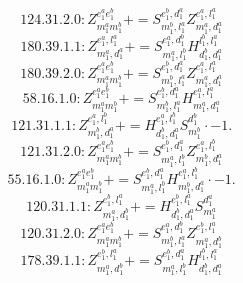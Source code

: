 \documentclass[letterpaper,10pt,fleqn,leqno,onecolumn]{article}
\begin{document}
\begin{equation} \;\;\;\;\;\;  124.31.2.0: Z^{e_{1}^{a}e_{1}^{b}}_{m_{1}^{a}m_{1}^{b}}+=S^{e_{1}^{b},d_{1}^{a}}_{m_{1}^{b},l_{1}^{a}}Z^{e_{1}^{a},l_{1}^{a}}_{m_{1}^{a},d_{1}^{a}} \end{equation}
\begin{equation} \;\;\;\;\;\;  180.39.1.1: Z^{e_{1}^{a},l_{1}^{a}}_{m_{1}^{a},d_{1}^{a}}+=S^{e_{1}^{a},d_{1}^{b}}_{m_{1}^{a},l_{1}^{b}}H^{l_{1}^{b},l_{1}^{a}}_{d_{1}^{b},d_{1}^{a}} \end{equation}
\begin{equation} \;\;\;\;\;\;  180.39.2.0: Z^{e_{1}^{a}e_{1}^{b}}_{m_{1}^{a}m_{1}^{b}}+=S^{e_{1}^{b},d_{1}^{a}}_{m_{1}^{b},l_{1}^{a}}Z^{e_{1}^{a},l_{1}^{a}}_{m_{1}^{a},d_{1}^{a}} \end{equation}
\begin{equation} \;\;\;\;\;\;  58.16.1.0: Z^{e_{1}^{a}e_{1}^{b}}_{m_{1}^{a}m_{1}^{b}}+=S^{e_{1}^{b},d_{1}^{a}}_{m_{1}^{b},l_{1}^{a}}H^{e_{1}^{a},l_{1}^{a}}_{m_{1}^{a},d_{1}^{a}} \end{equation}
\begin{equation} \;\;\;\;\;\;  121.31.1.1: Z^{e_{1}^{a},l_{1}^{b}}_{m_{1}^{b},d_{1}^{a}}+=H^{e_{1}^{a},l_{1}^{b}}_{d_{1}^{b},d_{1}^{a}}S^{d_{1}^{b}}_{m_{1}^{b}}\cdot -1. \end{equation}
\begin{equation} \;\;\;\;\;\;  121.31.2.0: Z^{e_{1}^{a}e_{1}^{b}}_{m_{1}^{a}m_{1}^{b}}+=S^{e_{1}^{b},d_{1}^{a}}_{m_{1}^{a},l_{1}^{b}}Z^{e_{1}^{a},l_{1}^{b}}_{m_{1}^{b},d_{1}^{a}} \end{equation}
\begin{equation} \;\;\;\;\;\;  55.16.1.0: Z^{e_{1}^{a}e_{1}^{b}}_{m_{1}^{a}m_{1}^{b}}+=S^{e_{1}^{b},d_{1}^{a}}_{m_{1}^{a},l_{1}^{b}}H^{e_{1}^{a},l_{1}^{b}}_{m_{1}^{b},d_{1}^{a}}\cdot -1. \end{equation}
\begin{equation} \;\;\;\;\;\;  120.31.1.1: Z^{e_{1}^{b},l_{1}^{a}}_{m_{1}^{a},d_{1}^{b}}+=H^{e_{1}^{b},l_{1}^{a}}_{d_{1}^{b},d_{1}^{a}}S^{d_{1}^{a}}_{m_{1}^{a}} \end{equation}
\begin{equation} \;\;\;\;\;\;  120.31.2.0: Z^{e_{1}^{a}e_{1}^{b}}_{m_{1}^{a}m_{1}^{b}}+=S^{e_{1}^{a},d_{1}^{b}}_{m_{1}^{b},l_{1}^{a}}Z^{e_{1}^{b},l_{1}^{a}}_{m_{1}^{a},d_{1}^{b}} \end{equation}
\begin{equation} \;\;\;\;\;\;  178.39.1.1: Z^{e_{1}^{b},l_{1}^{a}}_{m_{1}^{a},d_{1}^{b}}+=S^{e_{1}^{b},d_{1}^{a}}_{m_{1}^{a},l_{1}^{b}}H^{l_{1}^{b},l_{1}^{a}}_{d_{1}^{b},d_{1}^{a}} \end{equation}
\end{document}
